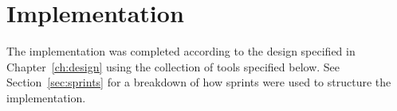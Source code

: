 \chapter{Implementation}

The implementation was completed according to the design specified in Chapter~\ref{ch:design} using the collection of tools specified below. See Section~\ref{sec:sprints} for a breakdown of how sprints were used to structure the implementation.



